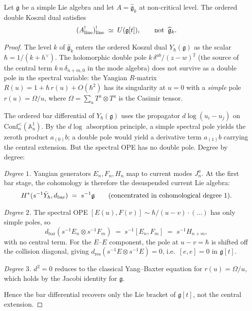 \begin{theorem}
\ClaimStatusProvedHere
\label{thm:central-extension-invisible}
\label{thm:double-bar-sl2}
Let $\mathfrak{g}$ be a simple Lie algebra and let
$A = \widehat{\mathfrak{g}}_k$ at non-critical level. The ordered
double Koszul dual satisfies
\[
(A^{!}_{\mathrm{line}})^{!}_{\mathrm{line}}
\;\simeq\;
U(\mathfrak{g}[t]),
\qquad
\textup{not}\;\;
\widehat{\mathfrak{g}}_k.
\]
\end{theorem}

\begin{proof}
The level $k$ of $\widehat{\mathfrak{g}}_k$ enters the ordered Koszul dual
$Y_\hbar(\mathfrak{g})$ as the scalar $\hbar = 1/(k + h^\vee)$.
The holomorphic double pole $k\,\delta^{ab}/(z-w)^2$ (the source
of the central term $k\,n\,\delta_{n+m,0}$ in the mode algebra)
does not survive as a double pole in the spectral variable: the
Yangian $R$-matrix $R(u) = 1 + \hbar\,r(u) + O(\hbar^2)$ has its
singularity at $u = 0$ with a \emph{simple} pole $r(u) = \Omega/u$,
where $\Omega = \sum_a T^a \otimes T^a$ is the Casimir tensor.

The ordered bar differential of $Y_\hbar(\mathfrak{g})$ uses the
propagator $d\log(u_i - u_j)$ on
$\mathrm{Conf}_n^{<}(\mathbb{A}^1_u)$. By the $d\log$ absorption
principle, a simple spectral pole yields the zeroth product
$a_{(0)}b$; a double pole would yield a derivative term
$a_{(1)}b$ carrying the central extension. But the spectral OPE has
no double pole. Degree by degree:

\smallskip\noindent\emph{Degree $1$.}
Yangian generators $E_n, F_n, H_n$ map to current modes $J^a_n$.
At the first bar stage, the cohomology is therefore the
desuspended current Lie algebra:
\begin{equation}\label{eq:bar-degree1-yangian}
 H^*(s^{-1}\bar{Y}_\hbar, d_{\mathrm{bar}})
 \;=\;
 s^{-1}\mathfrak{g}
 \qquad
 \textup{(concentrated in cohomological degree~$1$).}
\end{equation}

\smallskip\noindent\emph{Degree $2$.}
The spectral OPE
$[E(u), F(v)] \sim \hbar/(u-v)\cdot(\ldots)$ has only simple poles, so
\[
d_{\mathrm{bar}}(s^{-1}E_n \otimes s^{-1}F_m)
\;=\;
s^{-1}[E_n, F_m]
\;=\;
s^{-1}H_{n+m},
\]
with no central term. For the $E$--$E$ component, the pole at
$u - v = \hbar$ is shifted off the collision diagonal, giving
$d_{\mathrm{res}}(s^{-1}E \otimes s^{-1}E) = 0$, i.e.\
$[e,e] = 0$ in $\mathfrak{g}[t]$.

\smallskip\noindent\emph{Degree $3$.}
$d^2 = 0$ reduces to the classical Yang--Baxter equation for
$r(u) = \Omega/u$, which holds by the Jacobi identity for
$\mathfrak{g}$.

\smallskip
Hence the bar differential recovers only the Lie bracket of
$\mathfrak{g}[t]$, not the central extension.
\end{proof}

